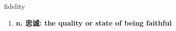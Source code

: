 
\begin{frame}
{\huge fidelity}
\begin{center}
\begin{enumerate}\Large
  \item \textbf{n. 忠诚: the quality or state of being faithful}
\end{enumerate}
\end{center}
\end{frame}
